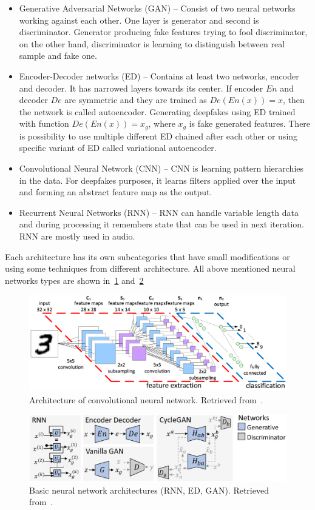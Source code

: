 \begin{itemize}
\item Generative Adversarial Networks (GAN) – Consist of two neural networks working against each other. One layer is generator and second is discriminator. Generator producing fake features trying to fool discriminator, on the other hand, discriminator is learning to distinguish between real sample and fake one.
\item Encoder-Decoder networks (ED) – Contains at least two networks, encoder and decoder. It has narrowed layers towards its center. If encoder \(En\) and decoder \(De\) are symmetric and they are trained as \(De(En(x)) = x\), then the network is called autoencoder. Generating deepfakes using ED trained with function \(De(En(x)) = x_g\), where \(x_g\) is fake generated features. There is possibility to use multiple different ED chained after each other or using specific variant of ED called variational autoencoder.
\item Convolutional Neural Network (CNN) – CNN is learning pattern hierarchies in the data. For deepfakes purposes, it learns filters applied over the input and forming an abstract feature map as the output.
\item Recurrent Neural Networks (RNN) – RNN can handle variable length data and during processing it remembers state that can be used in next iteration. RNN are mostly used in audio.
\end{itemize}

Each architecture has its own subcategories that have small modifications or using some techniques from different architecture. All above mentioned neural networks types are shown in~\ref{fig:nns_architecture} and~\ref{fig:cnn_architecture} 

\begin{figure}[H]
    \centering
    \includegraphics[width=.7\linewidth]{other-fig/cnn.png}
    \caption{Architecture of convolutional neural network. Retrieved from~\cite{CNNArchitecture}.}
    \label{fig:nns_architecture}
\end{figure}

\begin{figure}[H]
    \centering
    \includegraphics[width=.65\linewidth]{other-fig/nns.png}
    \caption{Basic neural network architectures (RNN, ED, GAN). Retrieved from~\cite{CreationandDetectionofDeepfakes}.}
\label{fig:cnn_architecture}
\end{figure}

